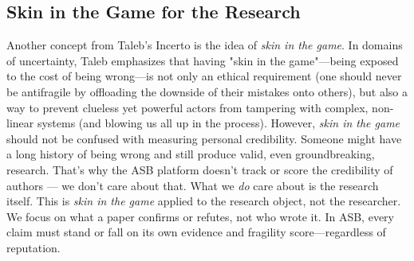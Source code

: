 \subsection{Skin in the Game for the Research}
Another concept from Taleb's Incerto is the idea of \emph{skin in the game}\cite{Taleb2018}. In domains of uncertainty, Taleb emphasizes that having "skin in the game"—being exposed to the cost of being wrong—is not only an ethical requirement (one should never be antifragile by offloading the downside of their mistakes onto others), but also a way to prevent clueless yet powerful actors from tampering with complex, non-linear systems (and blowing us all up in the process).
However, \emph{skin in the game} should not be confused with measuring personal credibility. Someone might have a long history of being wrong and still produce valid, even groundbreaking, research. That’s why the ASB platform doesn't track or score the credibility of authors — we don't care about that. What we \emph{do} care about is the research itself. 
This is \emph{skin in the game} applied to the research object, not the researcher. We focus on what a paper confirms or refutes, not who wrote it. In ASB, every claim must stand or fall on its own evidence and fragility score—regardless of reputation.